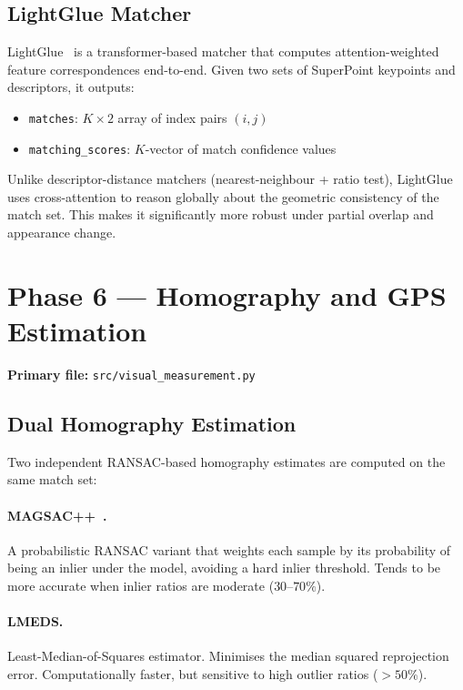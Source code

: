 \documentclass[12pt,a4paper]{article}
\begin{document}
\subsection{LightGlue Matcher}

LightGlue~\cite{lindenberger2023} is a transformer-based matcher that computes
attention-weighted feature correspondences end-to-end. Given two sets of
SuperPoint keypoints and descriptors, it outputs:

\begin{itemize}
    \item \texttt{matches}: $K \times 2$ array of index pairs $(i, j)$
    \item \texttt{matching\_scores}: $K$-vector of match confidence values
\end{itemize}

Unlike descriptor-distance matchers (nearest-neighbour + ratio test),
LightGlue uses cross-attention to reason globally about the geometric
consistency of the match set. This makes it significantly more robust
under partial overlap and appearance change.

\section{Phase 6 --- Homography and GPS Estimation}

\noindent\textbf{Primary file:} \texttt{src/visual\_measurement.py}

\subsection{Dual Homography Estimation}

Two independent RANSAC-based homography estimates are computed on the same
match set:

\paragraph{MAGSAC++~\cite{barath2020}.}
A probabilistic RANSAC variant that weights each sample by its probability of
being an inlier under the model, avoiding a hard inlier threshold. Tends to be
more accurate when inlier ratios are moderate ($30$--$70\%$).

\paragraph{LMEDS.}
Least-Median-of-Squares estimator. Minimises the median squared reprojection
error. Computationally faster, but sensitive to high outlier ratios ($> 50\%$).
\end{document}
